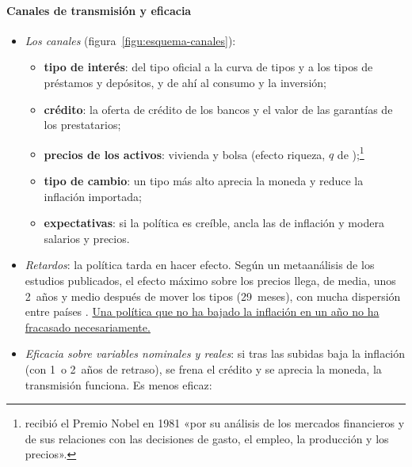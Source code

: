 \documentclass[11pt]{article}
\begin{document}
\begin{infografia}[!htb]
\centering
\caption{El tono de las políticas monetaria y fiscal}\label{figu:esquema-tono}
\end{infografia}

\paragraph{Canales de transmisión y eficacia}
\begin{itemize}
\item \emph{Los canales}  (figura~\ref{figu:esquema-canales}):
  \begin{itemize}
  \item \textbf{tipo de interés}: del tipo oficial a la curva de tipos y a los tipos de préstamos y depósitos, y de ahí al consumo y la inversión;
  \item \textbf{crédito}: la oferta de crédito de los bancos y el valor de las garantías de los prestatarios;
  \item \textbf{precios de los activos}: vivienda y bolsa (efecto riqueza, $q$ de );\footnote{ recibió el Premio Nobel en 1981 «por su análisis de los mercados financieros y de sus relaciones con las decisiones de gasto, el empleo, la producción y los precios»\nocite{Nobel1981Tobin}.}
  \item \textbf{tipo de cambio}: un tipo más alto aprecia la moneda y reduce la inflación importada;
  \item \textbf{expectativas}: si la política es creíble, ancla las de inflación y modera salarios y precios.
  \end{itemize}
\item \emph{Retardos}: la política tarda en hacer efecto. Según un metaanálisis de los estudios publicados, el efecto máximo sobre los precios llega, de media, unos 2~años y medio después de mover los tipos (29~meses), con mucha dispersión entre países \parencite{HavranekRusnak2013}. \uline{Una política que no ha bajado la inflación en un año no ha fracasado necesariamente.}
\item \emph{Eficacia sobre variables nominales y reales}: si tras las subidas baja la inflación (con 1~o 2~años de retraso), se frena el crédito y se aprecia la moneda, la transmisión funciona. Es menos eficaz:

\end{itemize}
\end{document}
